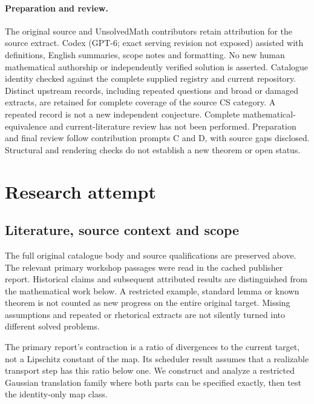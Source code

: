 \documentclass[11pt]{article}
\begin{document}
\paragraph{Preparation and review.}
The original source and UnsolvedMath contributors retain attribution for the source extract. Codex (GPT-6; exact serving revision not exposed) assisted with definitions, English summaries, scope notes and formatting. No new human mathematical authorship or independently verified solution is asserted. Catalogue identity checked against the complete supplied registry and current repository. Distinct upstream records, including repeated questions and broad or damaged extracts, are retained for complete coverage of the source CS category. A repeated record is not a new independent conjecture. Complete mathematical-equivalence and current-literature review has not been performed. Preparation and final review follow contribution prompts C and D, with source gaps disclosed. Structural and rendering checks do not establish a new theorem or open status.
\label{end:statement}

\section{Research attempt}
\subsection{Literature, source context and scope}
The full original catalogue body and source qualifications are preserved above. The relevant primary workshop passages were read in the cached publisher report. Historical claims and subsequent attributed results are distinguished from the mathematical work below. A restricted example, standard lemma or known theorem is not counted as new progress on the entire original target. Missing assumptions and repeated or rhetorical extracts are not silently turned into different solved problems.

The primary report's contraction is a ratio of divergences to the current target, not a Lipschitz constant of the map. Its scheduler result assumes that a realizable transport step has this ratio below one. We construct and analyze a restricted Gaussian translation family where both parts can be specified exactly, then test the identity-only map class.
\end{document}
